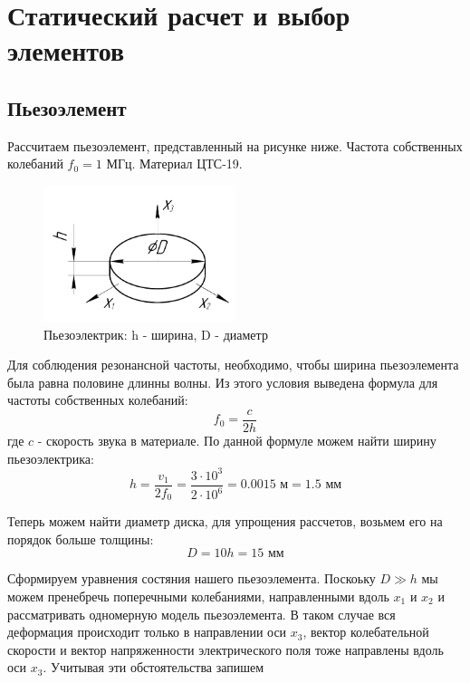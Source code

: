 \documentclass[a4paper, 12pt]{article}
\begin{document}
\section{Статический расчет и выбор элементов}
\subsection{Пьезоэлемент}
Рассчитаем пьезоэлемент, представленный на рисунке ниже. Частота собственных колебаний $f_0 = 1$ МГц. Материал ЦТС-19. \par 
\begin{figure}[h!]
	\begin{center}
	\includegraphics[width = 0.5\textwidth] {images/PiezoceramicScheme.pdf}
	\end{center}
	\caption{Пьезоэлектрик: h - ширина, D - диаметр}
\end{figure}
Для соблюдения резонансной частоты, необходимо, чтобы ширина пьезоэлемента была равна половине длинны волны. Из этого условия выведена формула для частоты собственных колебаний:
\begin{equation}
	f_0 = \frac{c}{2h}
\end{equation}
где $c$ - скорость звука в материале. По данной формуле можем найти ширину пьезоэлектрика:
\begin{equation}
	h = \frac{v_1}{2f_0} = \frac{3\cdot 10^3}{2\cdot10^6} = 0.0015 \text{ м} = 1.5\text{ мм}
\end{equation}

Теперь можем найти диаметр диска, для упрощения рассчетов, возьмем его на порядок больше толщины:
\begin{equation}
	D = 10h = 15 \text{ мм}
\end{equation}

Сформируем уравнения состяния нашего пьезоэлемента. Поскоьку $D \gg h$ мы можем пренебречь поперечными колебаниями, направленными вдоль $x_1$ и $x_2$ и рассматривать одномерную модель пьезоэлемента. В таком случае вся деформация происходит только в направлении оси $x_3$, вектор колебательной скорости и вектор напряженности электрического поля тоже направлены вдоль оси $x_3$. Учитывая эти обстоятельства запишем
\end{document}
